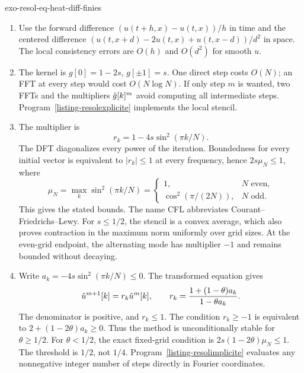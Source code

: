 \begin{correction}{exo-resol-eq-heat-diff-finies}
\begin{enumerate}
\item Use the forward difference $(u(t+h,x)-u(t,x))/h$ in time and the
centered difference $(u(t,x+d)-2u(t,x)+u(t,x-d))/d^2$ in space.
The local consistency errors are $O(h)$ and $O(d^2)$ for smooth $u$.
\item The kernel is $g[0]=1-2s$, $g[\pm1]=s$. One direct step costs $O(N)$;
an FFT at every step would cost $O(N\log N)$. If only step $m$ is wanted,
two FFTs and the multipliers $\hat{g}[k]^m$ avoid computing all intermediate
steps. Program~\ref{listing-resolexplicite} implements the local stencil.
\begin{listing}[H]
\caption{Explicit heat evolution by a three-point stencil.}
\label{listing-resolexplicite}
\end{listing}
\item The multiplier is
\[
 r_k=1-4s\sin^2(\pi k/N).
\]
The DFT diagonalizes every power of the iteration. Boundedness for every
initial vector is equivalent to $|r_k|\leq1$ at every frequency, hence
$2s\mu_N\leq1$, where
\[
 \mu_N=\max_k\sin^2(\pi k/N)=
 \begin{cases}1,&N\text{ even},\\\cos^2(\pi/(2N)),&N\text{ odd}.\end{cases}
\]
This gives the stated bounds. The name CFL abbreviates
Courant--Friedrichs--Lewy. For $s\leq1/2$, the stencil is a convex average,
which also proves contraction in the maximum norm uniformly over grid sizes.
At the even-grid endpoint, the alternating mode has multiplier $-1$ and
remains bounded without decaying.
\item Write $a_k=-4s\sin^2(\pi k/N)\leq0$. The transformed equation gives
\[
 \hat{u}^{m+1}[k]=r_k\hat{u}^m[k],\qquad
 r_k=\frac{1+(1-\theta)a_k}{1-\theta a_k}.
\]
The denominator is positive, and $r_k\leq1$. The condition $r_k\geq-1$
is equivalent to $2+(1-2\theta)a_k\geq0$.
Thus the method is unconditionally stable for $\theta\geq1/2$.
For $\theta<1/2$, the exact fixed-grid condition is
$2s(1-2\theta)\mu_N\leq1$. The threshold is $1/2$, not $1/4$.
Program~\ref{listing-resolimplicite} evaluates any nonnegative integer
number of steps directly in Fourier coordinates.
\begin{listing}[H]
\caption{The one-dimensional theta method in Fourier coordinates.}
\label{listing-resolimplicite}
\end{listing}

\end{enumerate}
\end{correction}
